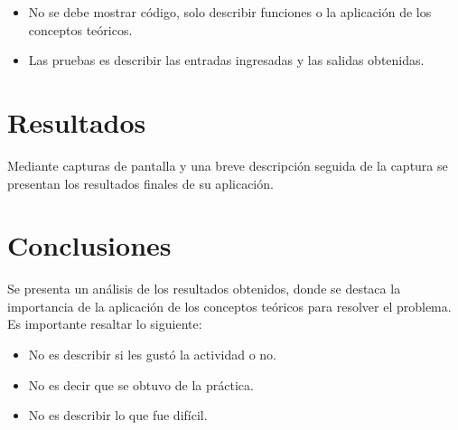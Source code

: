 \documentclass[letterpaper,12pt,oneside]{article}
\begin{document}
\begin{itemize}
    \item No se debe mostrar código, solo describir funciones o la aplicación de los conceptos teóricos.
    \item Las pruebas es describir las entradas ingresadas y las salidas obtenidas.
\end{itemize}

\section{Resultados}

Mediante capturas de pantalla y una breve descripción seguida de la captura se presentan los resultados finales de su aplicación.

\section{Conclusiones}

Se presenta un análisis de los resultados obtenidos, donde se destaca la importancia de la aplicación de los conceptos teóricos para resolver el problema. Es importante resaltar lo siguiente:

\begin{itemize}
    \item No es describir si les gustó la actividad o no.
    \item No es decir que se obtuvo de la práctica.
    \item No es describir lo que fue difícil.
\end{itemize}

\printbibliography
\end{document}
